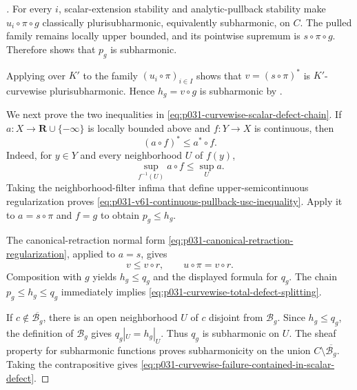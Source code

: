 
\begin{proof}[]
For every $i$, scalar-extension stability and analytic-pullback stability
\cite[Proposition~4.2(5),(6)]{GR25Classical} make
$u_i\circ\pi\circ g$ classically plurisubharmonic, equivalently
subharmonic, on $C$.  The pulled family remains locally upper bounded, and
its pointwise supremum is $s\circ\pi\circ g$.  Therefore
 shows that $p_g$ is subharmonic.

Applying  over $K'$ to the
family $(u_i\circ\pi)_{i\in I}$ shows that
$v=(s\circ\pi)^*$ is $K'$-curvewise plurisubharmonic.  Hence $h_g=v\circ g$
is subharmonic by .

We next prove the two inequalities in
\eqref{eq:p031-curvewise-scalar-defect-chain}.  If $a:X\to
\mathbf R\cup\{-\infty\}$ is locally bounded above and $f:Y\to X$ is
continuous, then
\begin{equation}
\label{eq:p031-v61-continuous-pullback-usc-inequality}
                         (a\circ f)^*\leq a^*\circ f.
\end{equation}
Indeed, for $y\in Y$ and every neighborhood $U$ of $f(y)$,
\[
        \sup_{f^{-1}(U)}a\circ f\leq\sup_U a.
\]
Taking the neighborhood-filter infima that define upper-semicontinuous
regularization proves
\eqref{eq:p031-v61-continuous-pullback-usc-inequality}.  Apply it to
$a=s\circ\pi$ and $f=g$ to obtain $p_g\leq h_g$.

The canonical-retraction normal form
\eqref{eq:p031-canonical-retraction-regularization}, applied to $a=s$,
gives
\[
                         v\leq v\circ r,
                 \qquad u\circ\pi=v\circ r.
\]
Composition with $g$ yields $h_g\leq q_g$ and the displayed formula for
$q_g$.  The chain $p_g\leq h_g\leq q_g$ immediately implies
\eqref{eq:p031-curvewise-total-defect-splitting}.

If $c\notin\overline{\mathcal B_g}$, there is an open neighborhood $U$ of
$c$ disjoint from $\mathcal B_g$.  Since $h_g\leq q_g$, the definition of
$\mathcal B_g$ gives $q_g|_U=h_g|_U$.  Thus $q_g$ is subharmonic on $U$.
The sheaf property for subharmonic functions
\cite[Proposition~3.5(1)]{GR25Classical} proves subharmonicity on the union
$C\setminus\overline{\mathcal B_g}$.  Taking the contrapositive gives
\eqref{eq:p031-curvewise-failure-contained-in-scalar-defect}.
\end{proof}

